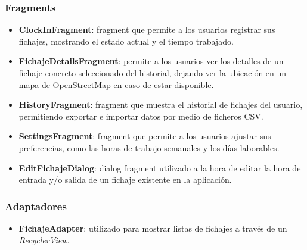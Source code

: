 \subsubsection{Fragments}
\begin{itemize}
  \item \textbf{ClockInFragment}: fragment que permite a los usuarios registrar sus fichajes, mostrando el estado actual y el tiempo trabajado.
  \item \textbf{FichajeDetailsFragment}: permite a los usuarios ver los detalles de un fichaje concreto seleccionado del historial, dejando ver la ubicación en un mapa de OpenStreetMap en caso de estar disponible.
  \item \textbf{HistoryFragment}: fragment que muestra el historial de fichajes del usuario, permitiendo exportar e importar datos por medio de ficheros CSV.
  \item \textbf{SettingsFragment}: fragment que permite a los usuarios ajustar sus preferencias, como las horas de trabajo semanales y los días laborables.
  \item \textbf{EditFichajeDialog}: dialog fragment utilizado a la hora de editar la hora de entrada y/o salida de un fichaje existente en la aplicación.
\end{itemize}

\subsubsection{Adaptadores}
\begin{itemize}
  \item \textbf{FichajeAdapter}: utilizado para mostrar listas de fichajes a través de un \textit{RecyclerView}.
\end{itemize}

